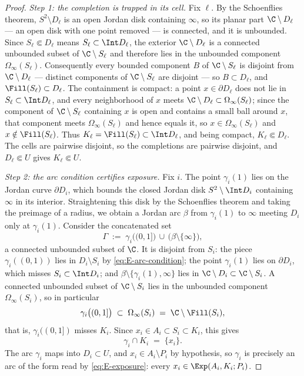 \begin{proof}
\emph{Step 1: the completion is trapped in its cell.}
Fix $\ell$. By the Schoenflies theorem, $S^2\setminus D_\ell$ is an open Jordan disk
containing $\infty$, so its planar part $\C\setminus D_\ell$ --- an open disk with
one point removed --- is connected, and it is unbounded. Since
$S_\ell\Subset D_\ell$ means $S_\ell\subset\Int D_\ell$, the exterior
$\C\setminus D_\ell$ is a connected unbounded subset of $\C\setminus S_\ell$ and
therefore lies in the unbounded component $\Omega_\infty(S_\ell)$. Consequently
every bounded component $B$ of $\C\setminus S_\ell$ is disjoint from
$\C\setminus D_\ell$ --- distinct components of $\C\setminus S_\ell$ are disjoint
--- so $B\subset D_\ell$, and $\Fill(S_\ell)\subset D_\ell$. The containment is
compact: a point $x\in\partial D_\ell$ does not lie in $S_\ell\subset\Int D_\ell$,
and every neighborhood of $x$ meets $\C\setminus D_\ell\subset
\Omega_\infty(S_\ell)$; since the component of $\C\setminus S_\ell$ containing $x$
is open and contains a small ball around $x$, that component meets
$\Omega_\infty(S_\ell)$ and hence equals it, so $x\in\Omega_\infty(S_\ell)$ and
$x\notin\Fill(S_\ell)$. Thus $K_\ell=\Fill(S_\ell)\subset\Int D_\ell$, and being
compact, $K_\ell\Subset D_\ell$. The cells are pairwise disjoint, so the completions
are pairwise disjoint, and $D_\ell\Subset U$ gives $K_\ell\Subset U$.

\emph{Step 2: the arc condition certifies exposure.}
Fix $i$. The point $\gamma_i(1)$ lies on the Jordan curve $\partial D_i$, which
bounds the closed Jordan disk $S^2\setminus\Int D_i$ containing $\infty$ in its
interior. Straightening this disk by the Schoenflies theorem \cite{New51} and taking
the preimage of a radius, we obtain a Jordan arc $\beta$ from $\gamma_i(1)$ to
$\infty$ meeting $D_i$ only at $\gamma_i(1)$. Consider the concatenated set
\[
\Gamma\;:=\;\gamma_i\bigl((0,1]\bigr)\,\cup\,\bigl(\beta\setminus\{\infty\}\bigr),
\]
a connected unbounded subset of $\C$. It is disjoint from $S_i$: the piece
$\gamma_i((0,1))$ lies in $D_i\setminus S_i$ by \eqref{eq:E-arc-condition}; the
point $\gamma_i(1)$ lies on $\partial D_i$, which misses $S_i\subset\Int D_i$; and
$\beta\setminus\{\gamma_i(1),\infty\}$ lies in $\C\setminus D_i\subset
\C\setminus S_i$. A connected unbounded subset of $\C\setminus S_i$ lies in the
unbounded component $\Omega_\infty(S_i)$, so in particular
\[
\gamma_i\bigl((0,1]\bigr)\;\subset\;\Omega_\infty(S_i)
\;=\;\C\setminus\Fill(S_i),
\]
that is, $\gamma_i((0,1])$ misses $K_i$. Since $x_i\in A_i\subset S_i\subset K_i$,
this gives
\[
\gamma_i\cap K_i\;=\;\{x_i\} .
\]
The arc $\gamma_i$ maps into $D_i\subset U$, and $x_i\in A_i\setminus P_i$ by
hypothesis, so $\gamma_i$ is precisely an arc of the form read by
\eqref{eq:E-exposure}: every $x_i\in\Exp(A_i,K_i;P_i)$.


\end{proof}
